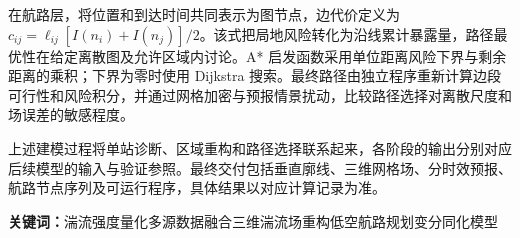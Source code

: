 在航路层，将位置和到达时间共同表示为图节点，边代价定义为 $c_{ij}=\ell_{ij}[I(n_i)+I(n_j)]/2$。该式把局地风险转化为沿线累计暴露量，路径最优性在给定离散图及允许区域内讨论。A* 启发函数采用单位距离风险下界与剩余距离的乘积；下界为零时使用 Dijkstra 搜索。最终路径由独立程序重新计算边段可行性和风险积分，并通过网格加密与预报情景扰动，比较路径选择对离散尺度和场误差的敏感程度。

上述建模过程将单站诊断、区域重构和路径选择联系起来，各阶段的输出分别对应后续模型的输入与验证参照。最终交付包括垂直廓线、三维网格场、分时效预报、航路节点序列及可运行程序，具体结果以对应计算记录为准。

\noindent\textbf{关键词：}湍流强度量化\quad 多源数据融合\quad 三维湍流场重构\quad 低空航路规划\quad 变分同化模型
